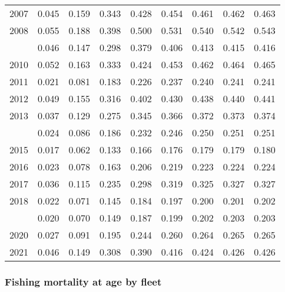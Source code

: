 \documentclass[
]{article}
\begin{document}
\begin{longtable}[t]{lrrrrrrrr}
2007 & 0.045 & 0.159 & 0.343 & 0.428 & 0.454 & 0.461 & 0.462 & 0.463\\
2008 & 0.055 & 0.188 & 0.398 & 0.500 & 0.531 & 0.540 & 0.542 & 0.543\\
\addlinespace
2009 & 0.046 & 0.147 & 0.298 & 0.379 & 0.406 & 0.413 & 0.415 & 0.416\\
2010 & 0.052 & 0.163 & 0.333 & 0.424 & 0.453 & 0.462 & 0.464 & 0.465\\
2011 & 0.021 & 0.081 & 0.183 & 0.226 & 0.237 & 0.240 & 0.241 & 0.241\\
2012 & 0.049 & 0.155 & 0.316 & 0.402 & 0.430 & 0.438 & 0.440 & 0.441\\
2013 & 0.037 & 0.129 & 0.275 & 0.345 & 0.366 & 0.372 & 0.373 & 0.374\\
\addlinespace
2014 & 0.024 & 0.086 & 0.186 & 0.232 & 0.246 & 0.250 & 0.251 & 0.251\\
2015 & 0.017 & 0.062 & 0.133 & 0.166 & 0.176 & 0.179 & 0.179 & 0.180\\
2016 & 0.023 & 0.078 & 0.163 & 0.206 & 0.219 & 0.223 & 0.224 & 0.224\\
2017 & 0.036 & 0.115 & 0.235 & 0.298 & 0.319 & 0.325 & 0.327 & 0.327\\
2018 & 0.022 & 0.071 & 0.145 & 0.184 & 0.197 & 0.200 & 0.201 & 0.202\\
\addlinespace
2019 & 0.020 & 0.070 & 0.149 & 0.187 & 0.199 & 0.202 & 0.203 & 0.203\\
2020 & 0.027 & 0.091 & 0.195 & 0.244 & 0.260 & 0.264 & 0.265 & 0.265\\
2021 & 0.046 & 0.149 & 0.308 & 0.390 & 0.416 & 0.424 & 0.426 & 0.426\\*
\end{longtable}

\hypertarget{fishing-mortality-at-age-by-fleet}{%
\subsubsection{Fishing mortality at age by
fleet}\label{fishing-mortality-at-age-by-fleet}}
\end{document}
